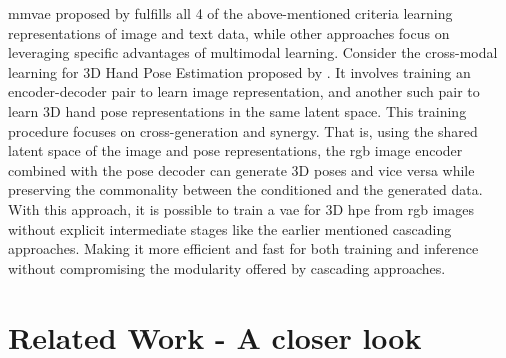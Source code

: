\ac{mmvae} proposed by \cite{MMVAE} fulfills all 4 of the above-mentioned criteria learning representations of image and text data, while other approaches focus on leveraging specific advantages of multimodal learning. Consider the cross-modal learning for 3D Hand Pose Estimation proposed by \cite{crossmodal}. It involves training an encoder-decoder pair to learn image representation, and another such pair to learn 3D hand pose representations in the same latent space. This training procedure focuses on cross-generation and synergy. That is, using the shared latent space of the image and pose representations, the \ac{rgb} image encoder combined with the pose decoder can generate 3D poses and vice versa while preserving the commonality between the conditioned and the generated data. With this approach, it is possible to train a \ac{vae} for 3D \ac{hpe} from \ac{rgb} images without explicit intermediate stages like the earlier mentioned cascading approaches. Making it more efficient and fast for both training and inference without compromising the modularity offered by cascading approaches.

\section{Related Work - A closer look}
\label{section:Related Work}
\lipsum[1-5] %
